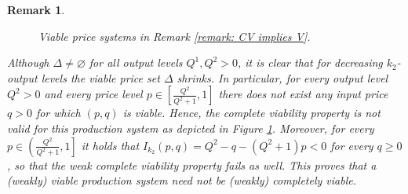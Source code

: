 \documentclass[11pt,fleqn]{article}
\newtheorem{remark}[theorem]{Remark}
\begin{document}
\begin{remark}
\begin{figure}[h]
\centering
{}
\caption{Viable price systems in Remark \ref{remark: CV implies V}.} \label{fig:RemCVnotV}
\end{figure}
		
\noindent
Although $\Delta \neq \varnothing$ for all output levels $Q^1, Q^2 >0$, it is clear that for decreasing $k_2$-output levels the viable price set $\Delta$ shrinks. In particular, for every output level $Q^2>0$ and every price level $p \in \left[ \tfrac{Q^2}{Q^2+1} , 1 \right]$ there does not exist any input price $q>0$ for which $(p,q)$ is viable. Hence, the complete viability property is not valid for this production system as depicted in Figure \ref{fig:RemCVnotV}. Moreover, for every $p \in \left( \tfrac{Q^2}{Q^2+1} , 1 \right]$ it holds that $I_{k_2} (p,q) = Q^2 - q - (Q^2+1) p <0$ for every $q \geqslant 0$, so that the weak complete viability property fails as well. This proves that a (weakly) viable production system need not be (weakly) completely viable.
\end{remark}
\end{document}
